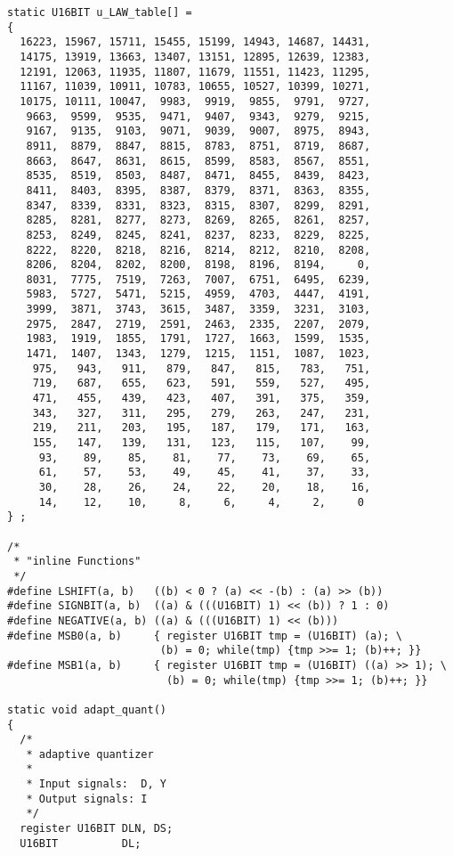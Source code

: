 \begin{verbatim}
static U16BIT u_LAW_table[] =
{
  16223, 15967, 15711, 15455, 15199, 14943, 14687, 14431, 
  14175, 13919, 13663, 13407, 13151, 12895, 12639, 12383, 
  12191, 12063, 11935, 11807, 11679, 11551, 11423, 11295, 
  11167, 11039, 10911, 10783, 10655, 10527, 10399, 10271, 
  10175, 10111, 10047,  9983,  9919,  9855,  9791,  9727, 
   9663,  9599,  9535,  9471,  9407,  9343,  9279,  9215, 
   9167,  9135,  9103,  9071,  9039,  9007,  8975,  8943, 
   8911,  8879,  8847,  8815,  8783,  8751,  8719,  8687, 
   8663,  8647,  8631,  8615,  8599,  8583,  8567,  8551, 
   8535,  8519,  8503,  8487,  8471,  8455,  8439,  8423, 
   8411,  8403,  8395,  8387,  8379,  8371,  8363,  8355, 
   8347,  8339,  8331,  8323,  8315,  8307,  8299,  8291, 
   8285,  8281,  8277,  8273,  8269,  8265,  8261,  8257, 
   8253,  8249,  8245,  8241,  8237,  8233,  8229,  8225, 
   8222,  8220,  8218,  8216,  8214,  8212,  8210,  8208, 
   8206,  8204,  8202,  8200,  8198,  8196,  8194,     0, 
   8031,  7775,  7519,  7263,  7007,  6751,  6495,  6239, 
   5983,  5727,  5471,  5215,  4959,  4703,  4447,  4191, 
   3999,  3871,  3743,  3615,  3487,  3359,  3231,  3103, 
   2975,  2847,  2719,  2591,  2463,  2335,  2207,  2079, 
   1983,  1919,  1855,  1791,  1727,  1663,  1599,  1535, 
   1471,  1407,  1343,  1279,  1215,  1151,  1087,  1023, 
    975,   943,   911,   879,   847,   815,   783,   751, 
    719,   687,   655,   623,   591,   559,   527,   495, 
    471,   455,   439,   423,   407,   391,   375,   359, 
    343,   327,   311,   295,   279,   263,   247,   231, 
    219,   211,   203,   195,   187,   179,   171,   163, 
    155,   147,   139,   131,   123,   115,   107,    99, 
     93,    89,    85,    81,    77,    73,    69,    65, 
     61,    57,    53,    49,    45,    41,    37,    33, 
     30,    28,    26,    24,    22,    20,    18,    16, 
     14,    12,    10,     8,     6,     4,     2,     0
} ;

/*
 * "inline Functions"
 */
#define LSHIFT(a, b)   ((b) < 0 ? (a) << -(b) : (a) >> (b))
#define SIGNBIT(a, b)  ((a) & (((U16BIT) 1) << (b)) ? 1 : 0)
#define NEGATIVE(a, b) ((a) & (((U16BIT) 1) << (b)))
#define MSB0(a, b)     { register U16BIT tmp = (U16BIT) (a); \
                        (b) = 0; while(tmp) {tmp >>= 1; (b)++; }}
#define MSB1(a, b)     { register U16BIT tmp = (U16BIT) ((a) >> 1); \
                         (b) = 0; while(tmp) {tmp >>= 1; (b)++; }}

static void adapt_quant()
{
  /*
   * adaptive quantizer
   *
   * Input signals:  D, Y
   * Output signals: I
   */
  register U16BIT DLN, DS;
  U16BIT          DL;


\end{verbatim}
